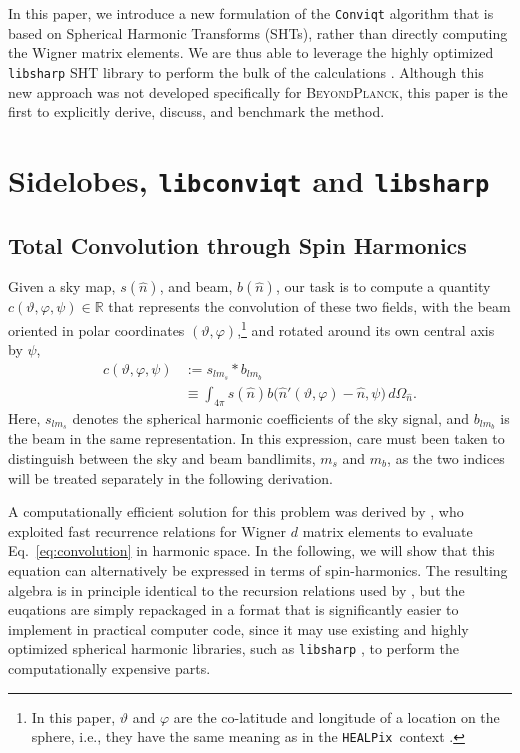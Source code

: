 \documentclass[twocolumn]{aa}
\def\healpix{\texttt{HEALPix}}
\newcommand{\BP}{\textsc{BeyondPlanck}}
\newcommand{\cvar}{\ensuremath{c(\vartheta, \varphi, \psi)}}
\begin{document}
In this paper, we introduce a new formulation of the \texttt{Conviqt} algorithm that is based on Spherical Harmonic Transforms (SHTs), rather than directly computing the Wigner matrix elements. We are thus able to leverage the highly optimized \texttt{libsharp} SHT library to perform the bulk of the calculations \citep{libsharp}. Although this new approach was not developed specifically for \BP, this paper is the first to explicitly derive, discuss, and benchmark the method.

\section{Sidelobes, \texttt{libconviqt} and \texttt{libsharp}}

\subsection{Total Convolution through Spin Harmonics}

\label{sec:conviqt}

Given a sky map, $s(\hat{n})$, and beam, $b(\hat{n})$, our task is to
compute a quantity $\cvar \in \mathbb{R}$ that represents the
convolution of these two fields, with the beam oriented in polar
coordinates $(\vartheta, \varphi)$,\footnote{In this paper, $\vartheta$ and $\varphi$ are the co-latitude and longitude of a location on the sphere, i.e., they have the same meaning as in the \healpix\ context \citep{gorski2005}.} and rotated around its own central
axis by $\psi$,
\begin{equation}
\begin{aligned}
  \cvar &:= s_{lm_s} * b_{lm_b}\\ 
   &\equiv \int_{4\pi} s(\hat{n})
  b\big(\hat{n}'(\vartheta,\varphi)-\hat{n},\psi\big)\, d\Omega_{\hat{n}}.
  \label{eq:convolution}
\end{aligned}
\end{equation}
Here, $s_{lm_s}$ denotes the spherical harmonic coefficients of the sky signal, and $b_{lm_b}$ is the beam in the same representation. In this expression, care must been taken to distinguish between the sky and beam bandlimits, $m_s$ and $m_b$, as the two indices will be treated separately in the following derivation.

A computationally efficient solution for this problem was derived by
\citet{conviqt}, who exploited fast recurrence relations for Wigner
$d$ matrix elements to evaluate Eq.~\eqref{eq:convolution} in harmonic
space. In the following, we will show that this equation
can alternatively be expressed in terms of spin-harmonics. The
resulting algebra is in principle identical to the recursion relations
used by \citet{conviqt}, but the euqations are simply repackaged
in a format that is significantly easier to implement in practical
computer code, since it may use existing and highly optimized
spherical harmonic libraries, such as \texttt{libsharp} \citep{libsharp}, to perform
the computationally expensive parts.
\end{document}
